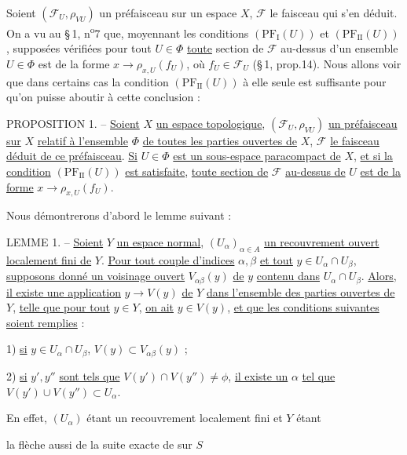Soient \((\mathscr F_U,\rho_{VU})\) un préfaisceau sur un espace \(X\), \(\mathscr F\) le faisceau qui s'en déduit. On a vu au \S\,1, n\textsuperscript{o}7 que, moyennant les conditions \((\mathrm{PF}_{\mathrm I}(U))\) et \((\mathrm{PF}_{\mathrm{II}}(U))\), supposées vérifiées pour tout \(U\in\Phi\) \uline{toute} section de \(\mathscr F\) au-dessus d'un ensemble \(U\in\Phi\) est de la forme \(x\longrightarrow\rho_{x,U}(f_U)\), où \(f_U\in\mathscr F_U\) (\S\,1, prop.14). Nous allons voir que dans certains cas la condition \((\mathrm{PF}_{\mathrm{II}}(U))\) à elle seule est suffisante pour qu'on puisse aboutir à cette conclusion :

PROPOSITION 1. -- \uline{Soient} \(X\) \uline{un espace topologique}, \((\mathscr F_U,\rho_{VU})\) \uline{un préfaisceau sur} \(X\) \uline{relatif à l'ensemble} \(\Phi\) \uline{de toutes les parties ouvertes de} \(X\), \(\mathscr F\) \uline{le faisceau déduit de ce préfaisceau}. \uline{Si} \(U\in\Phi\) \uline{est un sous-espace paracompact de} \(X\), \uline{et si la condition} \((\mathrm{PF}_{\mathrm{II}}(U))\) \uline{est satisfaite}, \uline{toute section de} \(\mathscr F\) \uline{au-dessus de} \(U\) \uline{est de la forme} \(x\longrightarrow\rho_{x,U}(f_U)\).

Nous démontrerons d'abord le lemme suivant :

LEMME 1. -- \uline{Soient} \(Y\) \uline{un espace normal}, \((U_\alpha)_{\alpha\in A}\) \uline{un recouvrement ouvert localement fini de} \(Y\). \uline{Pour tout couple d'indices} \(\alpha,\beta\) \uline{et tout} \(y\in U_\alpha\cap U_\beta\), \uline{supposons donné un voisinage ouvert} \(V_{\alpha\beta}(y)\) \uline{de} \(y\) \uline{contenu dans} \(U_\alpha\cap U_\beta\). \uline{Alors}, \uline{il existe une application} \(y\longrightarrow V(y)\) \uline{de} \(Y\) \uline{dans l'ensemble des parties ouvertes de} \(Y\), \uline{telle que pour tout} \(y\in Y\), \uline{on ait} \(y\in V(y)\), \uline{et que les conditions suivantes soient remplies} :

1) \uline{si} \(y\in U_\alpha\cap U_\beta\), \(V(y)\subset V_{\alpha\beta}(y)\) ;

2) \uline{si} \(y',y''\) \uline{sont tels que} \(V(y')\cap V(y'')\ne\phi\), \uline{il existe un} \(\alpha\) \uline{tel que} \(V(y')\cup V(y'')\subset U_\alpha\).

En effet, \((U_\alpha)\) étant un recouvrement localement fini et \(Y\) étant

la flèche  aussi de la suite exacte de  sur \(S\)

